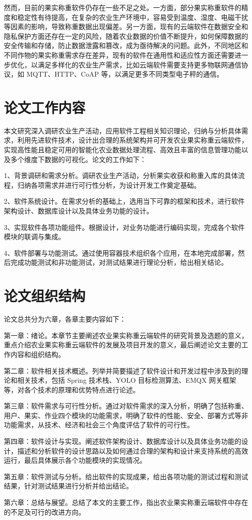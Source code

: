 然而，目前的果实称重软件仍存在一些不足之处。一方面，部分果实称重软件的精度和稳定性有待提高，在复杂的农业生产环境中，容易受到温度、湿度、电磁干扰等因素的影响，导致称重数据出现偏差\cite{汤建华2018}。另一方面，现有的云端软件在数据安全和隐私保护方面还存在一定的风险，随着农业数据的价值不断提升，如何保障数据的安全传输和存储，防止数据泄露和篡改，成为亟待解决的问题。此外，不同地区和不同作物的果实称重需求存在差异，现有的软件在通用性和适应性方面还需要进一步优化，以满足多样化的农业生产需求，比如云端软件需要支持更多物联网通信协议，如 MQTT、HTTP、CoAP 等，以满足更多不同类型电子秤的通信。

\section{论文工作内容}

本文研究深入调研农业生产活动，应用软件工程相关知识理论，归纳与分析具体需求，利用先进软件技术，设计出合理的系统架构并可开发农业果实称重云端软件，实现高性能且稳定可用的智能化农业数据处理流程、高效且丰富的信息管理功能以及多个维度下数据的可视化。论文的工作如下：

1、背景调研和需求分析。调研农业生产活动，分析果实收获和称重入库的具体流程，归纳各项需求并进行可行性分析，为设计开发工作奠定基础。

2、软件系统设计。在需求分析的基础上，选用当下可靠的框架和技术，进行软件架构设计、数据库设计以及具体业务功能的设计。

3、实现软件各项功能组件。根据设计，对业务功能进行编码实现，完成各个软件模块的联调与集成。

4、软件部署与功能测试。通过使用容器技术组织各个应用，在本地完成部署，然后完成功能测试和非功能测试，对测试结果进行理论分析，给出相关结论。

\section{论文组织结构}

论文总共分为六章，各章主要内容如下：

第一章：绪论。本章节主要阐述农业果实称重云端软件的研究背景及选题的意义，重点介绍农业果实称重云端软件的发展及项目开发的意义，最后阐述论文主要的工作内容和组织结构。

第二章：软件相关技术概述。列举并简要描述了软件设计和开发过程中涉及到的理论和相关技术，包括 Spring 技术栈、YOLO 目标检测算法、EMQX 网关框架等，对各个技术的原理和优势特点进行论述。

第三章：软件需求与可行性分析。通过对软件需求的深入分析，明确了包括称重、用户、果实、作业四个模块的功能需求，明确了软件的性能、安全、部署方式等非功能需求，从技术、经济和社会三个角度评估了软件的可行性。

第四章：软件设计与实现。阐述软件架构设计、数据库设计以及具体业务功能的设计，描述和分析软件的设计思路以及如何通过合理的架构和设计来支持系统的高效运行，最后具体展示各个功能模块的实现情况。

第五章：软件测试与分析。给出软件的实现成果，给出各项功能的测试过程和测试结果，针对测试结果进行分析并给出结论。

第六章：总结与展望。总结了本文的主要工作，指出农业果实称重云端软件中存在的不足及可行的改进方向。

